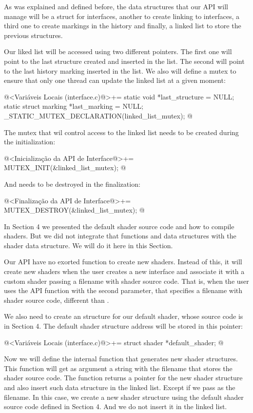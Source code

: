 As was explained and defined before, the data structures that our API
will manage will be a struct for interfaces, another to create linking
to interfaces, a third one to create markings in the history and
finally, a linked list to store the previous structures.

Our liked list will be accessed using two different pointers. The
first one will point to the last structure created and inserted in the
list. The second will point to the last history marking inserted in
the list. We also will define a mutex to ensure that only one thread
can update the linked list at a given moment:

\iniciocodigo
@<Variáveis Locais (interface.c)@>+=
static void *last_structure = NULL;
static struct marking *last_marking = NULL;
_STATIC_MUTEX_DECLARATION(linked_list_mutex);
@
\fimcodigo

The mutex that wil control access to the linked list needs to be
created during the initialization:

\iniciocodigo
@<Inicialização da API de Interface@>+=
MUTEX_INIT(&linked_list_mutex);
@
\fimcodigo

And needs to be destroyed in the finalization:

\iniciocodigo
@<Finalização da API de Interface@>+=
MUTEX_DESTROY(&linked_list_mutex);
@
\fimcodigo


In Section 4 we presented the default shader source code and how to
compile shaders. But we did not integrate that functions and data
structures with the shader data structure. We will do it here in this
Section.

Our API have no exorted function to create new shaders. Instead of
this, it will create new shaders when the user creates a new interface
and associate it with a custom shader passing a filename with shader
source code. That is, when the user uses the API
function  with the second parameter,
that specifies a filename with shader source code, different
than .

We also need to create an structure for our default shader, whose
source code is in Section 4. The default shader structure address will
be stored in this pointer:

\iniciocodigo
@<Variáveis Locais (interface.c)@>+=
struct shader *default_shader;
@
\fimcodigo

Now we will define the internal function that generates new shader
structures. This function will get as argument a string with the
filename that stores the shader source code. The function returns a
pointer for the new shader structure and also insert such data
structure in the linked list. Except if we pass  as
the filename. In this case, we create a new shader structure using the
default shader source code defined in Section 4. And we do not insert
it in the linked list.

